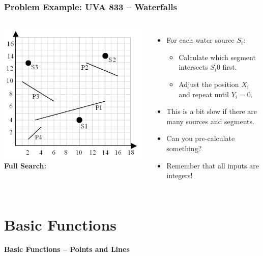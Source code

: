 \begin{frame}
  \frametitle{Problem Example: UVA 833 -- Waterfalls}
  \begin{columns}
      \includegraphics[width=1\textwidth]{img/waterfall}
    {\bf Full Search:}
    \begin{itemize}
      \item For each water source $S_i$:
      \begin{itemize}
        \item Calculate which segment intersects $\overline{S_i0}$ first.
        \item Adjust the position $X_i$ and repeat until $Y_i = 0$.
      \end{itemize}\bigskip

      \item This is a bit slow if there are many sources and segments.
      \item Can you pre-calculate something?
      \item Remember that all inputs are integers!
    \end{itemize}
  \end{columns}
\end{frame}

\section{Basic Functions}
\begin{frame}
  \centering
  {\bf Basic Functions -- Points and Lines}
\end{frame}

